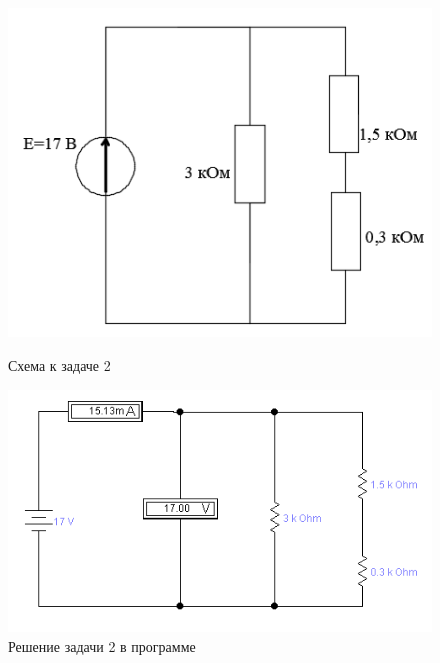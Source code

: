 \begin{figure}[H]
  \begin{center}
    \begin{minipage}[h]{0.36\linewidth}
        \includegraphics[width=1\textwidth]{authors/stepanuk-2-fig-3.png}
        \caption{Схема к задаче 2}
        \label{fig:stepanuk-2-fig-3}
    \end{minipage}
\hfill
    \begin{minipage}[h]{0.5\linewidth}
        \includegraphics[width=1\textwidth]{authors/stepanuk-2-fig-4.png}
        \caption{Решение задачи 2 в программе}
        \label{fig:stepanuk-2-fig-4}
    \end{minipage}


  \end{center}

\end{figure}
